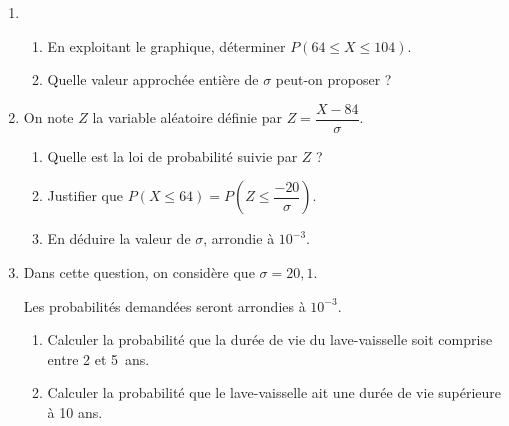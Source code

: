 \documentclass[12pt,french]{article}
\begin{document}
\begin{question}[subtitle={Pondichery 2015}]
\begin{enumerate}
\item 
	\begin{enumerate}
		\item En exploitant le graphique, déterminer $P(64 \leqslant X \leqslant 104)$.
		\item Quelle valeur approchée entière de $\sigma$ peut-on proposer ?
	\end{enumerate}
\item On note $Z$ la variable aléatoire définie par $Z = \dfrac{X - 84}{\sigma}$.
	\begin{enumerate}
		\item Quelle est la loi de probabilité suivie par $Z$ ?
		\item Justifier que $P(X \leqslant 64) = P \left(Z \leqslant \dfrac{- 20}{\sigma}\right)$.
		\item En déduire la valeur de $\sigma$, arrondie à $10^{-3}$.
	\end{enumerate}
\item Dans cette question, on considère que $\sigma = 20,1$.
	
Les probabilités demandées seront arrondies à $10^{-3}$.
	\begin{enumerate}
		\item Calculer la probabilité que la durée de vie du lave-vaisselle soit comprise entre 2 et 5~ans.
		\item Calculer la probabilité que le lave-vaisselle ait une durée de vie supérieure à
10 ans.
	\end{enumerate}
\end{enumerate}
\end{question}
\end{document}
